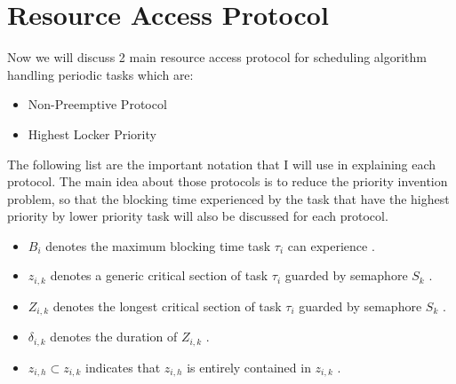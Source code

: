 \section{Resource Access Protocol}

Now we will discuss 2 main resource access protocol for scheduling algorithm handling periodic tasks which are:

\begin{itemize}
\item Non-Preemptive Protocol
\item Highest Locker Priority
\end{itemize}

 The following list are the important notation that I will use in explaining each protocol. The main idea about those protocols is to reduce the priority invention problem, so that the blocking time experienced by the task that have the highest priority by lower priority task will also be discussed for each protocol.

\begin{itemize}
\item $ B_{i} $ denotes the maximum blocking time task $ \tau_{i} $ can experience \cite{b5}.
\item $ z_{i,k} $ denotes a generic critical section of task $ \tau_{i} $ guarded by semaphore $ S_{k} $ \cite{b5}.
\item  $ Z_{i,k} $ denotes the longest critical section of task $ \tau_{i} $ guarded by semaphore $ S_{k} $ \cite{b5}.
\item $ \delta_{i,k} $ denotes the duration of $ Z_{i,k} $ \cite{b5}.
\item $ z_{i,h} \subset z_{i,k} $ indicates that $ z_{i,h} $ is entirely contained in $ z_{i,k} $ \cite{b5}.
\end{itemize}





